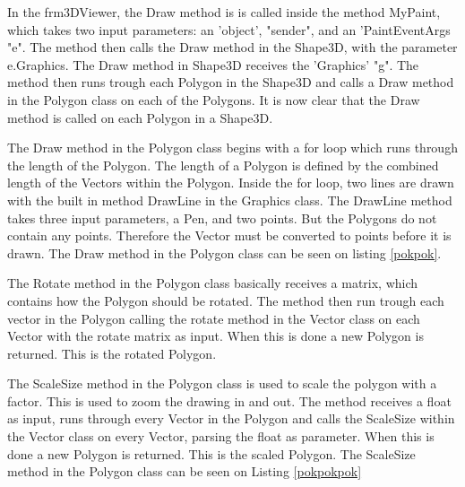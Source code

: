 In the frm3DViewer, the Draw method is is called inside the method MyPaint, which takes two input parameters: an 'object', "sender", and an 'PaintEventArgs "e". The method then calls the Draw method in the Shape3D, with the parameter e.Graphics. The Draw method in Shape3D receives the 'Graphics' "g". The method then runs trough each Polygon in the Shape3D and calls a Draw method in the Polygon class on each of the Polygons. It is now clear that the Draw method is called on each Polygon in a Shape3D.

The Draw method in the Polygon class begins with a for loop which runs through the length of the Polygon. The length of a Polygon is defined by the combined length of the Vectors within the Polygon.  Inside the for loop, two lines are drawn with the built in method DrawLine in the Graphics class. The DrawLine method takes three input parameters, a Pen, and two points. But the Polygons do not contain any points. Therefore the Vector must be converted to points before it is drawn. The Draw method in the Polygon class can be seen on listing \ref{pokpok}. 

The Rotate method in the Polygon class basically receives a matrix, which contains how the Polygon should be rotated. The method then run trough each vector in the Polygon calling the rotate method in the Vector class on each Vector with the rotate matrix as input. When this is done a new Polygon is returned. This is the rotated Polygon.

The ScaleSize method in the Polygon class is used to scale the polygon with a factor. This is used to zoom the drawing in and out. The method receives a float as input, runs through every Vector in the Polygon and calls the ScaleSize within the Vector class on every Vector, parsing the float as parameter.  When this is done a new Polygon is returned. This is the scaled Polygon. The ScaleSize method in the Polygon class can be seen on Listing  \ref{pokpokpok}

